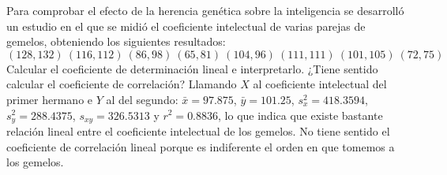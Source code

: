 {Para comprobar el efecto de la herencia genética sobre la inteligencia se desarrolló un estudio en el que se midió el
coeficiente intelectual de varias parejas de gemelos, obteniendo los siguientes resultados: 
\[
(128, 132)\ (116, 112)\ (86, 98)\ (65, 81)\ (104,96)\ (111,111)\ (101, 105)\ (72,75)
\]
Calcular el coeficiente de determinación lineal e interpretarlo.
¿Tiene sentido calcular el coeficiente de correlación?
}
{Llamando $X$ al coeficiente intelectual del primer hermano e $Y$ al del segundo: $\bar x=97.875$, $\bar y=101.25$,
$s_x^2=418.3594$, $s_y^2=288.4375$, $s_{xy}=326.5313$ y $r^2=0.8836$, lo que indica que existe bastante relación
lineal entre el coeficiente intelectual de los gemelos. No tiene sentido el coeficiente de correlación lineal porque es
indiferente el orden en que tomemos a los gemelos.
}
{}


